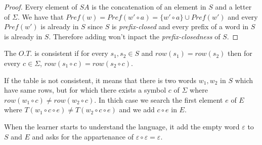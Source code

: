 \begin{proof}
  Every element of $SA$ is the concatenation of an element in $S$ and a letter of $\Sigma$. We have that $Pref(w) = Pref(w' \circ a) = \{w' \circ a\} \cup Pref(w')$ and every $Pref(w')$ is already in $S$ since $S$ is \textit{prefix-closed} and every prefix of a word in $S$ is already in $S$. Therefore adding \word{} won't inpact the \textit{prefix-closedness} of $S$.
\end{proof}

\begin{definition}[Consistence]
  The $O.T.$ is consistent if for every $s_1,s_2 \in S$ and $row(s_1) = row(s_2)$ then for every $c \in \Sigma$, $row(s_1 \circ c) = row(s_2 \circ c)$.
\end{definition}

If the table is not consistent, it means that there is two words $w_1, w_2$ in $S$ which have same rows, but for which there exists a symbol $c$ of $\Sigma$ where $row(w_1 \circ c) \neq row(w_2 \circ c)$. In thich case we search the first element $e$ of $E$ where $T(w_1 \circ c \circ e) \neq T(w_2 \circ c \circ e)$ and we add $c \circ e$ in $E$.

When the learner starts to understand the language, it add the empty word $\varepsilon$ to $S$ and $E$ and asks for the appartenance of $\varepsilon \circ \varepsilon = \varepsilon$.